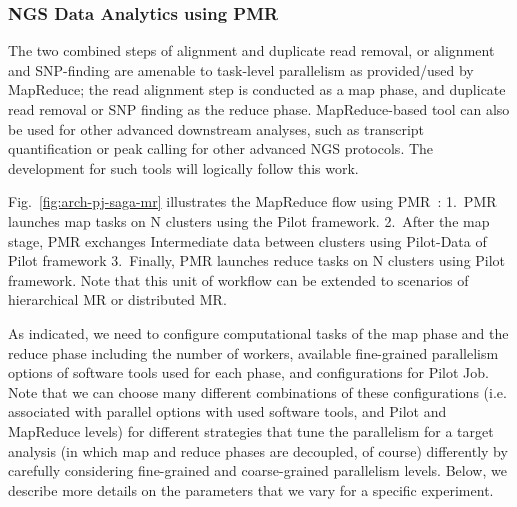 \documentclass{acm_proc_article-sp}
\begin{document}
\subsubsection{NGS Data Analytics using PMR}

The two combined steps of alignment and duplicate read removal, or
alignment and SNP-finding are amenable to task-level parallelism as
provided/used by MapReduce; the read alignment step is conducted as a
map phase, and duplicate read removal or SNP finding as the reduce
phase.  MapReduce-based tool can also be used for other advanced
downstream analyses, such as transcript quantification or peak calling
for other advanced NGS protocols.  The development for such tools will
logically follow this work.



Fig.~\ref{fig:arch-pj-saga-mr} illustrates the MapReduce flow using
PMR~\cite{pmr2012}: 1.~PMR launches map tasks on N clusters using the
Pilot framework. 2.~After the map stage, PMR exchanges Intermediate
data between clusters using Pilot-Data of Pilot framework 3.~Finally,
PMR launches reduce tasks on N clusters using Pilot framework.  Note
that this unit of workflow can be extended to scenarios of
hierarchical MR or distributed MR\cite{pmr2012}.

As indicated, we need to configure computational tasks of the map
phase and the reduce  phase including the number of workers, available
fine-grained parallelism options of software tools used for each
phase, and configurations for Pilot Job. Note that we can choose many
different combinations of these configurations (i.e. associated with
parallel options with used software tools, and Pilot and MapReduce
levels) for different strategies that tune the parallelism for a
target analysis (in which map and reduce phases are decoupled, of
course) differently by carefully considering fine-grained and
coarse-grained parallelism levels.  Below, we describe more details on
the parameters that we vary for a specific experiment.
\end{document}
